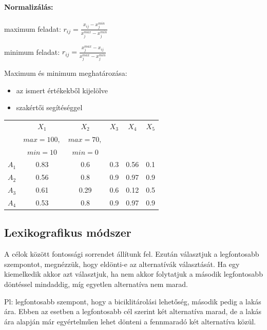 \documentclass[a4paper,12pt]{article}
\begin{document}
\paragraph{Normalizálás:} 
\begin{center}
maximum feladat: $r_{ij} = \frac{x_{ij} - x^{min}_j}{x^{max}_j - x^{min}_j} $ 

minimum feladat: $r_{ij} = \frac{x^{max}_j - x_{ij}}{x^{max}_j - x^{min}_j} $
\end{center}
Maximum és minimum meghatározása:
\vspace{-0.2cm}
\begin{itemize}
\item az ismert értékekből kijelölve
\vspace{-0.3cm}
\item szakértői segítéséggel
\end{itemize}

\begin{center}
\begin{tabular}{c||c|c|c|c|c}
 & $X_1$& $X_2$& $X_3$& $X_4$& $X_5$ \\
  &\small{$max=100,$}&\small{$max=70,$}	&		&		&	\\
 &\small{$min=10$}&\small{$min=0$}	&		&		& \\
 \hline
 $A_1$&0.83  &0.6 &  0.3 & 0.56 & 0.1 \\
 $A_2$&0.56  &0.8 & 0.9 & 0.97 & 0.9 \\
 $A_3$&0.61  &0.29 & 0.6 & 0.12 & 0.5 \\
 $A_4$&0.53  &0.8 & 0.9 & 0.97 & 0.9 \\
\end{tabular}
\end{center}

\subsection{Lexikografikus módszer}

A célok között fontossági sorrendet állítunk fel. Ezután választjuk a legfontosabb szempontot, megnézzük, hogy eldönti-e az alternatívák választását. Ha egy kiemelkedik akkor azt választjuk, ha nem akkor folytatjuk a második legfontosabb döntéssel mindaddig, míg egyetlen alternatíva nem marad.

Pl: legfontosabb szempont, hogy a biciklitárolási lehetőség, második pedig a lakás ára. Ebben az esetben a legfontosabb cél szerint két alternatíva marad, de a lakás ára alapján már egyértelműen lehet dönteni a fennmaradó két alternatíva közül.
\end{document}
